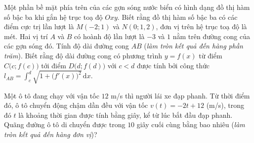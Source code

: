 \begin{bt}%
	Một phần bề mặt phía trên của các gợn sóng nước biển có hình dạng đồ thị hàm số bậc ba khi gắn hệ trục toạ độ $Oxy$. Biết rằng đồ thị hàm số bậc ba có các điểm  cực trị lần lượt là $M(-2;1)$ và $N(0;1{,}2)$, đơn vị trên hệ trục toạ độ là mét.
	Hai vị trí $A$ và $B$ có hoành độ lần lượt là $-3$ và $1$ nằm trên đường cong của các  gợn sóng đó.
	Tính độ dài đường cong $AB$ (\textit{làm tròn kết quả đến hàng phần trăm}). Biết rằng độ dài đường cong có phương trình $y=f(x)$ từ  điểm $C\big(c;f(c)\big)$ tới điểm $D\big(d;f(d)\big)$ với $c<d$ được tính bởi công thức $l_{AB} = \displaystyle\int_{c}^{d} \sqrt{1 + \big(f'(x)\big)^2}\mathrm{\,d}x$.
\end{bt}

\begin{bt}%
	Một ô  tô đang chạy với vận tốc $12$ m/s thì người lái xe đạp phanh.
	Từ thời điểm đó, ô tô chuyển động chậm dần đều với vận tốc $v(t)=-2t+12$ (m/s), trong đó $t$ là khoảng thời gian  được tính bằng giây, kể từ lúc bắt đầu đạp phanh.
	Quãng  đường ô tô di chuyển được trong $10$ giây cuối cùng bằng bao nhiêu (\textit{làm tròn kết quả đến hàng đơn vị})?
\end{bt}

